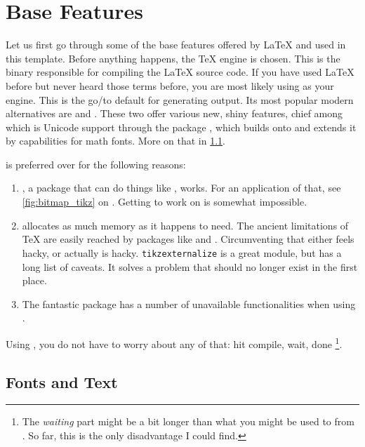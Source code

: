 \chapter{Base Features}
\label{ch:base-features}

Let us first go through some of the base features offered by \LaTeX{} and used in
this template.
Before anything happens, the \TeX{} engine is chosen.
This is the binary responsible for compiling the \LaTeX{} source code.
If you have used \LaTeX{} before but never heard those terms before, you are most
likely using  as your engine.
This is the go\-/to default for generating  output.
Its most popular modern alternatives are  and .
These two offer various new, shiny features, chief among which is Unicode
support through the package , which builds onto
 and extends it by capabilities for math fonts.
More on that in \cref{ch:fonts_text}.

 is preferred over  for the following reasons:
\begin{enumerate}
    \item {}, a package that can do things like
        , works.
        For an application of that, see \cref{fig:bitmap_tikz} on
        .
        Getting  to work on  is somewhat impossible.
    \item {} allocates as much memory as it happens to need.
        The ancient limitations of \TeX{} are easily reached by packages like
         and .
        Circumventing that either feels hacky, or actually is hacky.
        \texttt{tikzexternalize} is a great module, but has a long list of caveats.
        It solves a problem that should no longer exist in the first place.
    \item The fantastic  package has a number of unavailable
        functionalities when using .
\end{enumerate}
Using , you do not have to worry about any of that:
hit compile, wait, done%
\footnote{
    The \emph{waiting} part might be a bit longer than what you might be used to
    from .
    So far, this is the only disadvantage I could find.
}.

\section{Fonts and Text}
\label{ch:fonts_text}

